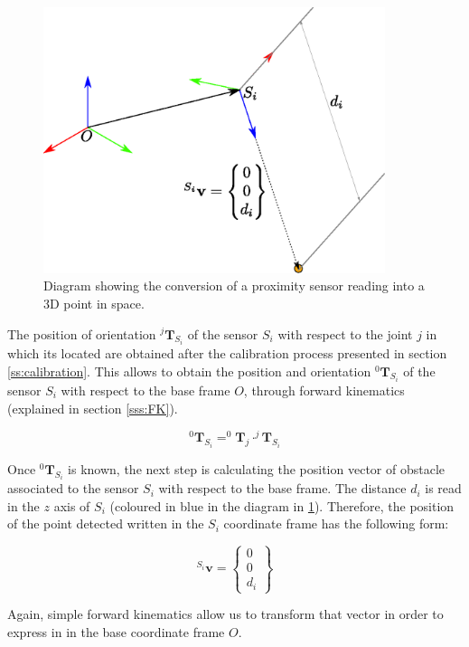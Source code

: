 \begin{figure}[H]
    \caption[]{
    Diagram showing the conversion of a proximity sensor reading into a 3D point in space.
    }
    \begin{center}
    \includegraphics[width=100mm]{figs/proximity_sensors.eps}
    \end{center}
    \label{fig:sensorreadingconversion}
\end{figure}

The position of orientation $^{j}\mathbf{T}_{S_i}$ of the sensor $S_i$ with respect to the joint $j$ in which its located are obtained after the calibration process presented in section \ref{ss:calibration}. This allows to obtain the position and orientation $^{0}\mathbf{T}_{S_i}$ of the sensor $S_i$ with respect to the base frame $O$, through forward kinematics (explained in section \ref{sss:FK}).

$$
^{0}\mathbf{T}_{S_i} = ^{0}\mathbf{T}_{j} \cdot ^{j}\mathbf{T}_{S_i}
$$

Once $^{0}\mathbf{T}_{S_i}$ is known, the next step is calculating the position vector of obstacle associated to the sensor $S_i$ with respect to the base frame. The distance $d_i$ is read in the $z$ axis of $S_i$ (coloured in blue in the diagram in \ref{fig:sensorreadingconversion}). Therefore, the position of the point detected written in the $S_i$ coordinate frame has the following form:

$$
^{S_i}\mathbf{v} =
\begin{Bmatrix}
0\\
0\\
d_i
\end{Bmatrix}
$$

Again, simple forward kinematics allow us to transform that vector in order to express in in the base coordinate frame $O$.

